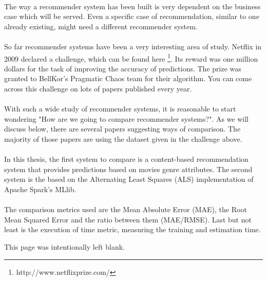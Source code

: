 \paragraph{}The way a recommender system has been built is very dependent on the business case which will be served. Even a specific case of recommendation, similar to one already existing, might need a different recommender system.

\paragraph{} So far recommender systems have been a very interesting area of study. Netflix in 2009 declared a challenge, which can be found here \footnote{http://www.netflixprize.com/}. Its reward was one million dollars for the task of improving the accuracy of predictions. The prize was granted to BellKor’s Pragmatic Chaos team for their algorithm. You can come across this challenge on lots of papers published every year.

\paragraph{} With such a wide study of recommender systems, it is reasonable to start wondering "How are we going to compare recommender systems?". As we will discuss below, there are several papers suggesting ways of comparison. The majority of those papers are using the dataset given in the challenge above.

\paragraph{} In this thesis, the first system to compare is a content-based recommendation system that provides predictions based on movies genre attributes. The second system is the based on the Alternating Least Squares (ALS) implementation of Apache Spark's MLlib.

\paragraph{} The comparison metrics used are the Mean Absolute Error (MAE), the Root Mean Squared Error and the ratio between them (MAE/RMSE). Last but not least is the execution of time metric, measuring the training and estimation time.

\newpage
\begin{center}
	This page was intentionally left blank.
\end{center}
\newpage

